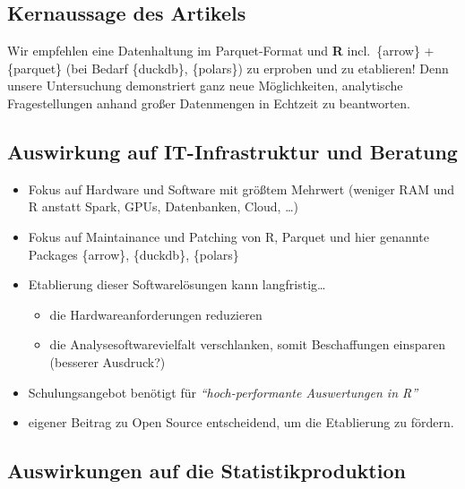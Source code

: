 \documentclass[
  german,
  10pt,
  twoside]{article}
\providecommand{\tightlist}{%
  \setlength{\itemsep}{0pt}\setlength{\parskip}{0pt}}
\begin{document}
\subsection{Kernaussage des Artikels}\label{kernaussage-des-artikels}

Wir empfehlen eine Datenhaltung im Parquet-Format und \textbf{R}
incl.~\{arrow\} + \{parquet\} (bei Bedarf \{duckdb\}, \{polars\}) zu
erproben und zu etablieren! Denn unsere Untersuchung demonstriert ganz
neue Möglichkeiten, analytische Fragestellungen anhand großer
Datenmengen in Echtzeit zu beantworten.

\subsection{Auswirkung auf IT-Infrastruktur und
Beratung}\label{auswirkung-auf-it-infrastruktur-und-beratung}

\begin{itemize}
\tightlist
\item
  Fokus auf Hardware und Software mit größtem Mehrwert (weniger RAM und
  R anstatt Spark, GPUs, Datenbanken, Cloud, \ldots)
\item
  Fokus auf Maintainance und Patching von R, Parquet und hier genannte
  Packages \{arrow\}, \{duckdb\}, \{polars\}
\item
  Etablierung dieser Softwarelösungen kann langfristig\ldots{}

  \begin{itemize}
  \tightlist
  \item
    die Hardwareanforderungen reduzieren
  \item
    die Analysesoftwarevielfalt verschlanken, somit Beschaffungen
    einsparen (besserer Ausdruck?)
  \end{itemize}
\item
  Schulungsangebot benötigt für \emph{``hoch-performante Auswertungen in
  R''}
\item
  eigener Beitrag zu Open Source entscheidend, um die Etablierung zu
  fördern.
\end{itemize}

\subsection{Auswirkungen auf die
Statistikproduktion}\label{auswirkungen-auf-die-statistikproduktion}
\end{document}
